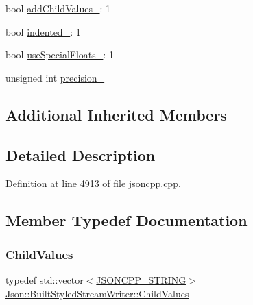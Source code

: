 \begin{DoxyCompactItemize}
\item 
bool \hyperlink{struct_json_1_1_built_styled_stream_writer_abed9cc31da503b48798e7cea68c42e16}{add\+Child\+Values\+\_\+}\+: 1
\item 
bool \hyperlink{struct_json_1_1_built_styled_stream_writer_a6aa0ad023e623f600103631a6bca6d10}{indented\+\_\+}\+: 1
\item 
bool \hyperlink{struct_json_1_1_built_styled_stream_writer_a6f1b8694b4eb17ab8c34f6d6dd8c8a4a}{use\+Special\+Floats\+\_\+}\+: 1
\item 
unsigned int \hyperlink{struct_json_1_1_built_styled_stream_writer_a6373d8d0ae4741b64e3904e4db0eef46}{precision\+\_\+}
\end{DoxyCompactItemize}
\subsection*{Additional Inherited Members}


\subsection{Detailed Description}


Definition at line 4913 of file jsoncpp.\+cpp.



\subsection{Member Typedef Documentation}
\hypertarget{struct_json_1_1_built_styled_stream_writer_a63196b38400e5ce452f65ce856d47b6f}{}\label{struct_json_1_1_built_styled_stream_writer_a63196b38400e5ce452f65ce856d47b6f} 
\subsubsection{\texorpdfstring{Child\+Values}{ChildValues}}
{\footnotesize\ttfamily typedef std\+::vector$<$\hyperlink{config_8h_a1e723f95759de062585bc4a8fd3fa4be}{J\+S\+O\+N\+C\+P\+P\+\_\+\+S\+T\+R\+I\+NG}$>$ \hyperlink{struct_json_1_1_built_styled_stream_writer_a63196b38400e5ce452f65ce856d47b6f}{Json\+::\+Built\+Styled\+Stream\+Writer\+::\+Child\+Values}\hspace{0.3cm}{\ttfamily [private]}}



